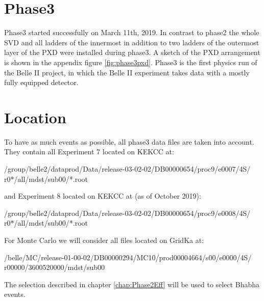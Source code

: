 \documentclass[a4paper,11pt,twosided,final,german,openbib,pdftex,listof=totoc,bibliography=totoc]{scrbook}
\begin{document}
\section{Phase3}
\label{sec:P3}

Phase3 started successfully on March 11th, 2019. In contrast to phase2 the whole SVD and all ladders of the innermost in addition to two ladders of the outermost layer of the PXD were installed during phase3. A sketch of the PXD arrangement is shown in the appendix figure \ref{fig:phase3pxd}. Phase3 is the first physics run of the Belle II project, in which the Belle II experiment takes data with a mostly fully equipped detector.\cite{phase3}

\section{Location}

To have as much events as possible, all phase3 data files are taken into account. They contain all Experiment 7 located on KEKCC at:
\newline

/group/belle2/dataprod/Data/release-03-02-02/DB00000654/proc9/e0007/4S/
r0*/all/mdst/sub00/*.root
\newline 

and Experiment 8 located on KEKCC at (as of October 2019):
\newline

/group/belle2/dataprod/Data/release-03-02-02/DB00000654/proc9/e0008/4S/
r0*/all/mdst/sub00/*.root
\newline

For Monte Carlo we will consider all files located on GridKa at:
\newline 

/belle/MC/release-01-00-02/DB00000294/MC10/prod00004664/s00/e0000/4S/
r00000/3600520000/mdst/sub00
\newline

The selection described in chapter \ref{chap:Phase2Eff} will be used to select Bhabha events.
\end{document}
